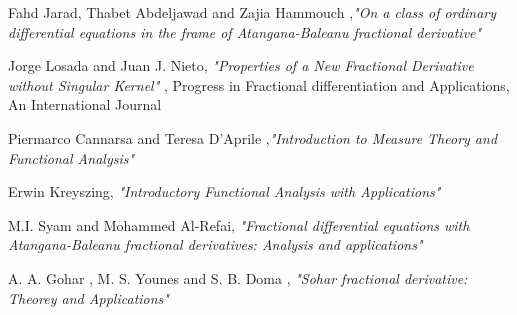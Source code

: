 \documentclass[twoside]{book}
\begin{document}
{\begin{enumerate}[label={[\arabic*]}]
    \item Fahd Jarad, Thabet Abdeljawad and Zajia Hammouch ,\textit{"On a class of ordinary differential equations in the frame of Atangana-Baleanu fractional derivative"}
    \item Jorge Losada and Juan J. Nieto, \textit{"Properties of a New Fractional Derivative without Singular Kernel"} , Progress in Fractional differentiation and Applications, An International Journal
    \item Piermarco Cannarsa and Teresa D'Aprile ,\textit{"Introduction to Measure Theory and Functional Analysis"}
    \item Erwin Kreyszing, \textit{"Introductory Functional Analysis with Applications"}
    \item M.I. Syam and Mohammed Al-Refai, \textit{"Fractional differential equations with Atangana-Baleanu fractional derivatives: Analysis and applications"}
    \item A. A. Gohar , M. S. Younes and S. B. Doma , \textit{"Sohar fractional derivative: Theorey and Applications"}
\end{enumerate}




}
\end{document}
